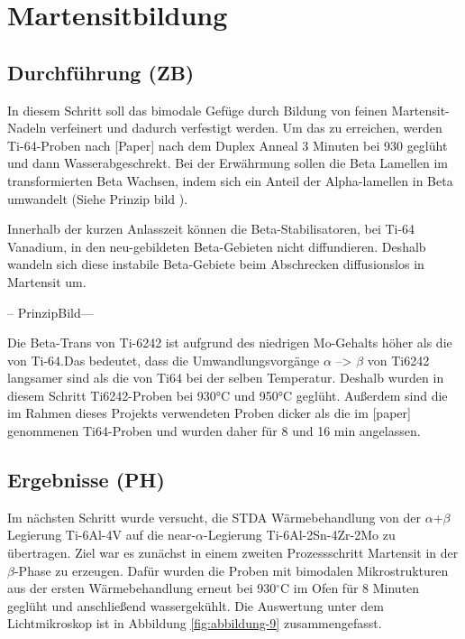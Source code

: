 \chapter{Martensitbildung}

\section{Durchführung (ZB)}

In diesem Schritt soll das bimodale Gefüge durch Bildung von feinen Martensit-Nadeln verfeinert und dadurch verfestigt werden. Um das zu erreichen, werden Ti-64-Proben nach [Paper] nach dem Duplex Anneal 3 Minuten bei 930 geglüht und dann Wasserabgeschrekt. Bei der Erwährmung sollen die Beta Lamellen im transformierten Beta Wachsen, indem sich ein Anteil der Alpha-lamellen in Beta umwandelt (Siehe Prinzip bild ).

Innerhalb der kurzen Anlasszeit können die Beta-Stabilisatoren, bei Ti-64 Vanadium, in den neu-gebildeten Beta-Gebieten nicht diffundieren. Deshalb wandeln sich diese instabile Beta-Gebiete beim Abschrecken diffusionslos in Martensit um.



\vspace{1ex}

-- PrinzipBild---


Die Beta-Trans von Ti-6242 ist aufgrund des niedrigen Mo-Gehalts höher als die von Ti-64.Das bedeutet, dass die Umwandlungsvorgänge $\alpha$ --> $\beta$ von Ti6242 langsamer sind als die von Ti64 bei der selben Temperatur. Deshalb wurden in diesem Schritt Ti6242-Proben   bei 930°C und 950°C  geglüht. Außerdem sind die im Rahmen dieses Projekts verwendeten Proben dicker als die im [paper] genommenen Ti64-Proben und wurden daher für 8 und 16 min angelassen.



\section{Ergebnisse (PH)}

Im nächsten Schritt wurde versucht, die STDA Wärmebehandlung von der $\alpha$+$\beta$ Legierung Ti-6Al-4V auf die near-$\alpha$-Legierung Ti-6Al-2Sn-4Zr-2Mo zu übertragen. Ziel war es zunächst in einem zweiten Prozessschritt Martensit in der $\beta$-Phase zu erzeugen. Dafür wurden die Proben mit bimodalen Mikrostrukturen aus der ersten Wärmebehandlung erneut bei 930$^\circ$C im Ofen für 8 Minuten geglüht und anschließend wassergekühlt. Die Auswertung unter dem Lichtmikroskop ist in Abbildung \ref{fig:abbildung-9} zusammengefasst.

